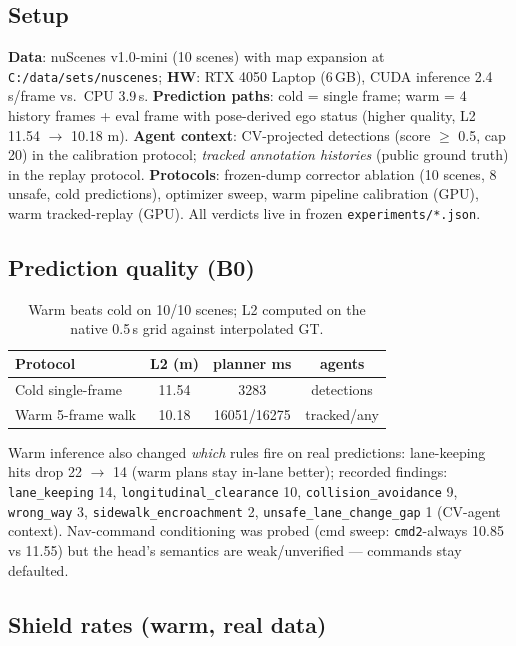 \documentclass[11pt]{article}
\begin{document}
\subsection{Setup}
\textbf{Data}: nuScenes v1.0-mini (10 scenes) with map expansion at
\texttt{C:/data/sets/nuscenes}; \textbf{HW}: RTX 4050 Laptop (6\,GB),
CUDA inference 2.4\,s/frame vs.\ CPU 3.9\,s. \textbf{Prediction
paths}: cold = single frame; warm = 4 history frames + eval frame
with pose-derived ego status (higher quality, L2 11.54 $\to$ 10.18 m).
\textbf{Agent context}: CV-projected detections (score $\ge$ 0.5,
cap 20) in the calibration protocol; \emph{tracked annotation
histories} (public ground truth) in the replay protocol.
\textbf{Protocols}: frozen-dump corrector ablation (10 scenes, 8
unsafe, cold predictions), optimizer sweep, warm pipeline calibration
(GPU), warm tracked-replay (GPU). All verdicts live in frozen
\texttt{experiments/*.json}.

\subsection{Prediction quality (B0)}

\begin{table}[h]
\centering\small
\begin{tabular}{lccc}
\toprule
Protocol & L2 (m) & planner ms & agents \\
\midrule
Cold single-frame & 11.54 & 3283 & detections \\
Warm 5-frame walk & 10.18 & 16051/16275 & tracked/any \\
\bottomrule
\end{tabular}
\caption{Warm beats cold on 10/10 scenes; L2 computed on the native
0.5\,s grid against interpolated GT.}
\label{tab:b0}
\end{table}

Warm inference also changed \emph{which} rules fire on real
predictions: lane-keeping hits drop 22 $\to$ 14 (warm plans stay
in-lane better); recorded findings: \texttt{lane\_keeping} 14,
\texttt{longitudinal\_clearance} 10, \texttt{collision\_avoidance} 9,
\texttt{wrong\_way} 3, \texttt{sidewalk\_encroachment} 2,
\texttt{unsafe\_lane\_change\_gap} 1 (CV-agent context). Nav-command
conditioning was probed (cmd sweep: \texttt{cmd2}-always 10.85 vs
11.55) but the head's semantics are weak/unverified --- commands stay
defaulted.

\subsection{Shield rates (warm, real data)}
\end{document}
